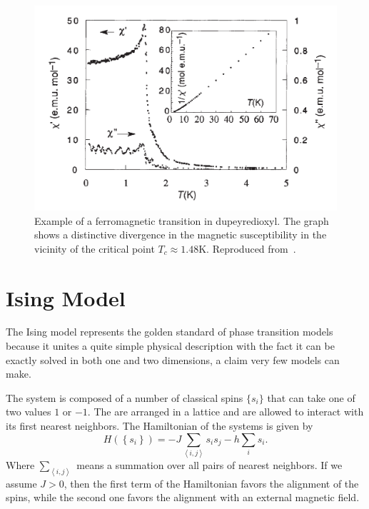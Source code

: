 \begin{figure}[h]
\begin{center}
    \includegraphics[scale=0.6]{chapters/ch2-crit/figs/suscep}
\end{center}
\caption{Example of a ferromagnetic transition in dupeyredioxyl. The graph
    shows a distinctive divergence in the magnetic susceptibility in the
    vicinity of the critical point $T_c\approx1.48$K. Reproduced
    from~\cite{Chiarelli1993}.}
\label{fig:suscep}
\end{figure}


\section{Ising Model}
\label{sec:ising}

The Ising model represents the golden standard of phase transition models
because it unites a quite simple physical description with the fact it can be
exactly solved in both one and two dimensions, a claim very few models can
make.

The system is composed of a number of classical spins $\{s_i\}$ that can take
one of two values $1$ or $-1$. The are arranged in a lattice and are allowed to
interact with its first nearest neighbors. The Hamiltonian of the systems is
given by
\begin{equation}
    \label{eq:ising}
    H\left(\left\{s_{i}\right\}\right) = 
        -J\sum_{\left\langle i,j\right\rangle}s_{i}s_{j}
        -h\sum_{i}s_{i}.
\end{equation}
Where $\sum_{\left\langle i,j\right\rangle}$ means a summation over all pairs
of nearest neighbors. If we assume $J>0$, then the first term of the
Hamiltonian favors the alignment of the spins, while the second one 
favors the alignment with an external magnetic field.

